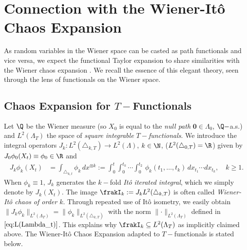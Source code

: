 \section{Connection with the Wiener-It\^o Chaos Expansion}
\label{sec:chaos}
As  random variables in the Wiener space can be casted as path functionals and vice versa, we expect the functional Taylor expansion to share   similarities with the Wiener chaos expansion \cite{Oksendal,Nualart}.
We recall the essence of 
this elegant theory, seen through the lens of functionals on the Wiener space.

\subsection{Chaos Expansion for $T-$Functionals}
Let $\Q$ be the Wiener measure (so $X_0$ is equal to the \textit{null path} $\boldsymbol{0}\in \Lambda_0$,  $\Q-$a.s.) and  $L^2(\Lambda_T)$  the space of \textit{square integrable $T-$functionals}.  %
We introduce the integral  operators %
$J_k:L^2(\triangle_{k,T}) \to L^2(\Lambda) $, $k\in \N$, ($L^2(\triangle_{0,T}) =\R$) given by  $J_{0}\phi_0(X_t) \equiv  \phi_0 \in \R$ and 
 \begin{align} \label{eq:chaosOperator}
  J_{k}\phi_k(X_t) &= \int_{\triangle_{k,t}} \phi_k\, dx^{\otimes k} :=\int_{0}^{t} \int_{0}^{t_k} \cdots \int_{0}^{t_2} \, \phi_k(t_1,\ldots,t_k) \, dx_{t_1} \cdots dx_{t_k}, \quad  k\ge 1.
\end{align}
When $\phi_k \equiv 1$, $J_k$ generates the $k-$fold \textit{It\^o iterated integral}, which we simply denote by $J_{k}(X_t)$.
The image  %
$\frakI_k: = J_k L^2(\triangle_{k,T})$ %
is often called  \textit{Wiener-Itô chaos of order $k$}. Through repeated use of It\^o isometry, we easily obtain $\lVert J_{k}\phi_k \rVert_{L^2(\Lambda_{T})} = \lVert \phi_k  \rVert_{L^2(\triangle_{k,T})} $ with the norm $\lVert \cdot \rVert_{L^2(\Lambda_{T})}$ defined in $\eqref{eq:L(Lambda_t)}$. This explains why
$\frakI_k \subseteq L^2(\Lambda_T)$ as implicitly claimed above. The Wiener-Itô Chaos Expansion adapted to  $T-$functionals is stated below.

